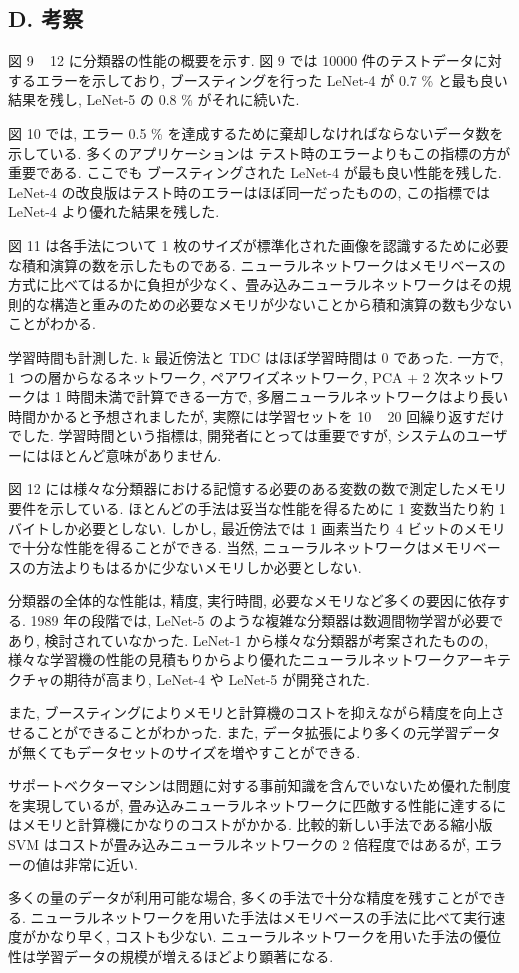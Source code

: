 \documentclass[twocolumn]{jarticle}     %
\begin{document}
\subsection*{D. 考察}
図 9 ~ 12 に分類器の性能の概要を示す. 
図 9 では 10000 件のテストデータに対するエラーを示しており, ブースティングを行った LeNet-4 が 0.7 \% と最も良い結果を残し, LeNet-5 の 0.8 \% がそれに続いた.
\par
図 10 では, エラー 0.5 \% を達成するために棄却しなければならないデータ数を示している. 多くのアプリケーションは テスト時のエラーよりもこの指標の方が重要である. ここでも ブースティングされた LeNet-4 が最も良い性能を残した. LeNet-4 の改良版はテスト時のエラーはほぼ同一だったものの, この指標では LeNet-4 より優れた結果を残した.
\par
図 11 は各手法について 1 枚のサイズが標準化された画像を認識するために必要な積和演算の数を示したものである. ニューラルネットワークはメモリベースの方式に比べてはるかに負担が少なく、畳み込みニューラルネットワークはその規則的な構造と重みのための必要なメモリが少ないことから積和演算の数も少ないことがわかる. 
\par
学習時間も計測した. k 最近傍法と TDC はほぼ学習時間は 0 であった.
一方で, 1 つの層からなるネットワーク, ペアワイズネットワーク, PCA + 2 次ネットワークは 1 時間未満で計算できる一方で, 多層ニューラルネットワークはより長い時間かかると予想されましたが, 実際には学習セットを 10 ~ 20 回繰り返すだけでした.
学習時間という指標は, 開発者にとっては重要ですが, システムのユーザーにはほとんど意味がありません.
\par
図 12 には様々な分類器における記憶する必要のある変数の数で測定したメモリ要件を示している.
ほとんどの手法は妥当な性能を得るために 1 変数当たり約 1 バイトしか必要としない. しかし, 最近傍法では  1 画素当たり 4 ビットのメモリで十分な性能を得ることができる.
当然, ニューラルネットワークはメモリベースの方法よりもはるかに少ないメモリしか必要としない.
\par
分類器の全体的な性能は, 精度, 実行時間, 必要なメモリなど多くの要因に依存する. 
1989 年の段階では, LeNet-5 のような複雑な分類器は数週間物学習が必要であり, 検討されていなかった.
LeNet-1 から様々な分類器が考案されたものの, 様々な学習機の性能の見積もりからより優れたニューラルネットワークアーキテクチャの期待が高まり, LeNet-4 や LeNet-5 が開発された.
\par
また, ブースティングによりメモリと計算機のコストを抑えながら精度を向上させることができることがわかった.
また, データ拡張により多くの元学習データが無くてもデータセットのサイズを増やすことができる.
\par
サポートベクターマシンは問題に対する事前知識を含んでいないため優れた制度を実現しているが, 畳み込みニューラルネットワークに匹敵する性能に達するにはメモリと計算機にかなりのコストがかかる. 
比較的新しい手法である縮小版 SVM はコストが畳み込みニューラルネットワークの 2 倍程度ではあるが, エラーの値は非常に近い. 
\par
多くの量のデータが利用可能な場合, 多くの手法で十分な精度を残すことができる. ニューラルネットワークを用いた手法はメモリベースの手法に比べて実行速度がかなり早く, コストも少ない.
ニューラルネットワークを用いた手法の優位性は学習データの規模が増えるほどより顕著になる.
\end{document}
